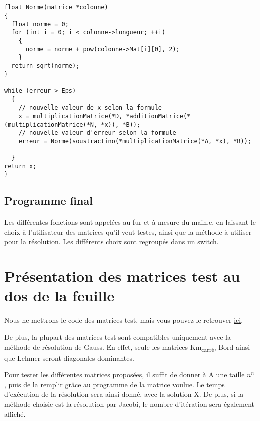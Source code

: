 \documentclass[letter]{article}
\begin{document}
\begin{enumerate}
\begin{verbatim}


float Norme(matrice *colonne)
{
  float norme = 0;
  for (int i = 0; i < colonne->longueur; ++i)
    {
      norme = norme + pow(colonne->Mat[i][0], 2);
    }
  return sqrt(norme);
}

while (erreur > Eps)
  {
    // nouvelle valeur de x selon la formule
    x = multiplicationMatrice(*D, *additionMatrice(*(multiplicationMatrice(*N, *x)), *B));
    // nouvelle valeur d'erreur selon la formule
    erreur = Norme(soustractino(*multiplicationMatrice(*A, *x), *B));

  }
return x;
}

\end{verbatim}
\end{enumerate}

\subsection{Programme final}
\label{sec:org917d540}

Les différentes fonctions sont appelées au fur et à mesure du main.c, en laissant le choix à l'utilisateur des matrices qu'il veut testes, ainsi que la méthode à utiliser pour la résolution. Les différents choix sont regroupés dans un switch.



\section{Présentation des matrices test au dos de la feuille}
\label{sec:orgdb846fc}

Nous ne mettrons le code des matrices test, mais vous pouvez le retrouver \href{matricetest.c}{ici}.


De plus, la plupart des matrices test sont compatibles uniquement avec la méthode de résolution de Gauss. En effet, seule les matrices Km\textsubscript{carré}, Bord ainsi que Lehmer seront diagonales dominantes.

Pour tester les différentes matrices proposées, il suffit de donner à A une taille \(n^n\), puis de la remplir grâce au programme de la matrice voulue. Le temps d'exécution de la résolution sera ainsi donné, avec la solution X. De plus, si la méthode choisie est la résolution par Jacobi, le nombre d'itération sera également affiché.
\end{document}
